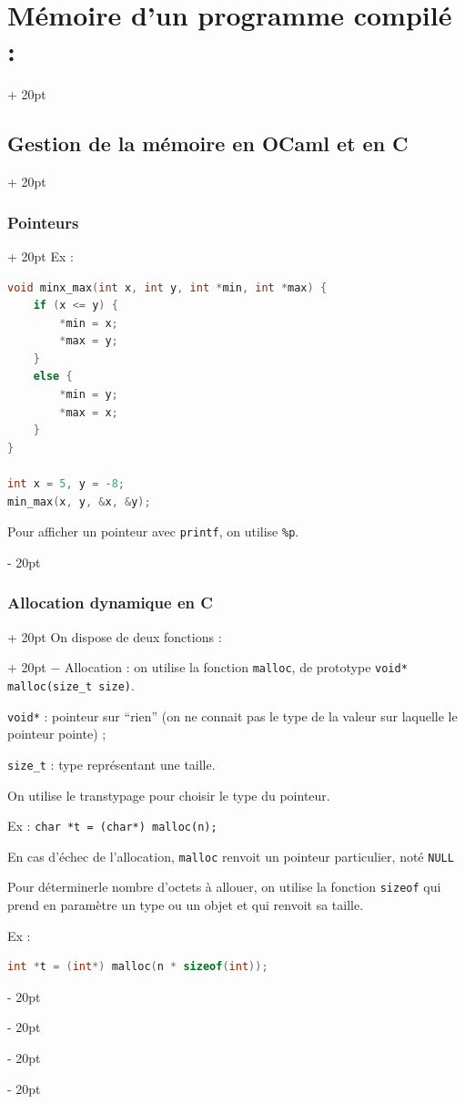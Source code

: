 \documentclass[a4paper, 12pt, twoside]{article}
\renewcommand{\emph}{\textcolor{ff4500}}
\renewcommand{\em}{\color{ff4500}}
\newcommand{\ind}[1][20pt]{\advance\leftskip + #1}
\newcommand{\deind}[1][20pt]{\advance\leftskip - #1}
\newenvironment{indentedenv}[1][20pt]{\par \ind[#1]}{\par \deind}
\newenvironment{indt}[2][20pt]{#2 \begin{indentedenv}[#1]}{\end{indentedenv}} %
\begin{document}
\begin{indt}{\section{Mémoire d'un programme compilé :}}
\begin{indt}{\subsection{Gestion de la mémoire en OCaml et en C}}
\begin{indt}{\subsubsection{Pointeurs}}
                Ex :
                \begin{lstlisting}[language=C, xleftmargin=80pt]
void minx_max(int x, int y, int *min, int *max) {
    if (x <= y) {
        *min = x;
        *max = y;
    }
    else {
        *min = y;
        *max = x;
    }
}

int x = 5, y = -8;
min_max(x, y, &x, &y);\end{lstlisting}
                
                Pour afficher un pointeur avec \texttt{printf}, on utilise \texttt{\%p}.
            \end{indt}
            
            \vspace{6pt}
            
            \begin{indt}{\subsubsection{Allocation dynamique en C}}
                 \begin{indt}{On dispose de deux fonctions :}
                    $-$ \emph{Allocation} : on utilise la fonction \texttt{\em malloc}, de prototype
                    \newline
                    \texttt{void* malloc(size\_t size)}.
                    
                    \texttt{void*} : pointeur sur ``rien'' (on ne connait pas le type de la valeur sur laquelle le pointeur pointe) ;
                    
                    \texttt{size\_t} : type représentant une taille.
                    
                    On utilise le transtypage pour choisir le type du pointeur.
                    
                    Ex : \texttt{char *t = (char*) malloc(n);}
                    
                    En cas d'échec de l'allocation, \texttt{malloc} renvoit un pointeur particulier, noté \texttt{NULL}
                    
                    Pour déterminerle nombre d'octets à allouer, on utilise la fonction \texttt{sizeof} qui prend en paramètre un type ou un objet et qui renvoit sa taille.
                    
                    Ex :
                    \begin{lstlisting}[language=C, xleftmargin=100pt]
int *t = (int*) malloc(n * sizeof(int));\end{lstlisting}
                    

\end{indt}
\end{indt}
\end{indt}
\end{indt}
\end{document}
